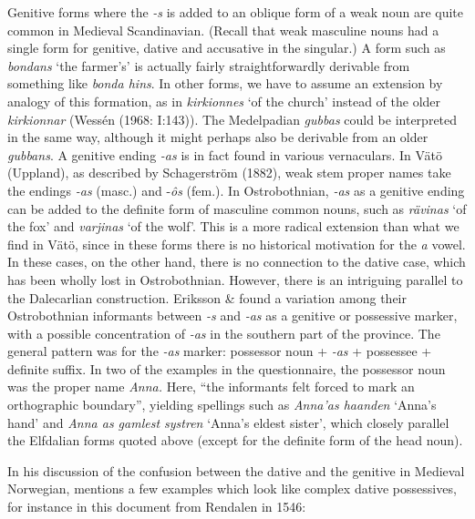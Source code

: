 \begin{styleBodyTextFirst}
Genitive forms where the\textit{ -s} is added to an oblique form of a weak noun are quite common in Medieval Scandinavian. (Recall that weak masculine nouns had a single form for genitive, dative and accusative in the singular.) A form such as \textit{bondans} ‘the farmer’s’ is actually fairly straightforwardly derivable from something like \textit{bonda hins}. In other forms, we have to assume an extension by analogy of this formation, as in \textit{kirkionnes} ‘of the church’ instead of the older \textit{kirkionnar} (Wessén (1968: I:143)). The Medelpadian \textit{gubbas} could be interpreted in the same way, although it might perhaps also be derivable from an older \textit{gubbans}. A genitive ending\textit{ -a}\textit{s} is in fact found in various vernaculars. In Vätö (Uppland), as described by Schagerström (1882), weak stem proper names take the endings\textit{ -a}\textit{s} (masc.) and \nobreakdash-\textit{ôs} (fem.). In Ostrobothnian,\textit{ -a}\textit{s} as a genitive ending can be added to the definite form of masculine common nouns, such as \textit{rävinas} ‘of the fox’ and \textit{varjinas} ‘of the wolf’. This is a more radical extension than what we find in Vätö, since in these forms there is no historical motivation for the \textit{a} vowel. In these cases, on the other hand, there is no connection to the dative case, which has been wholly lost in Ostrobothnian. However, there is an intriguing parallel to the Dalecarlian construction. Eriksson \& \citet[43]{Rendahl1999} found a variation among their Ostrobothnian informants between\textit{ -s} and\textit{ -a}\textit{s} as a genitive or possessive marker, with a possible concentration of\textit{ -a}\textit{s} in the southern part of the province. The general pattern was for the\textit{ -a}\textit{s} marker: possessor noun +\textit{ -a}\textit{s} + possessee + definite suffix. In two of the examples in the questionnaire, the possessor noun was the proper name \textit{Anna. }Here, “the informants felt forced to mark an orthographic boundary”, yielding spellings such as \textit{Anna’as haanden} ‘Anna’s hand’ and \textit{Anna as gamlest systren }‘Anna’s eldest sister’, which closely parallel the Elfdalian forms quoted above (except for the definite form of the head noun).

\end{styleBodyTextFirst}

\begin{styleBodytextC}
In his discussion of the confusion between the dative and the genitive in Medieval Norwegian, \citet{Larsen1895} mentions a few examples which look like complex dative possessives, for instance in this document from Rendalen in 1546:

\end{styleBodytextC}

